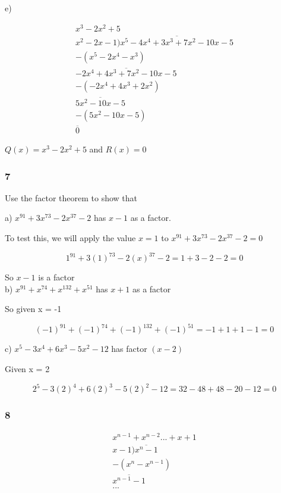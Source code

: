 \documentclass[]{report}
\begin{document}
e)

\begin{align*}
x^3 - 2x^2 + 5\\
x^2 -  2x - 1) \overline{x^5 - 4x^4 + 3x^3 + 7x^2 - 10x -5}\\
- (x^5 - 2x^4 - x^3)\\
\overline{-2x^4 +  4x^3 + 7x^2 - 10x - 5} \\
- (-2x^4 + 4x^3 + 2x^2)\\
\overline{5x^2 - 10x - 5}\\
- (5x^2 - 10x - 5)\\
\overline{0}
\end{align*}

$Q(x) = x^3 - 2x^2 + 5$ and $R(x) = 0$


\subsubsection{7}

Use the factor theorem to show that 

a) $x^91 + 3x^73 - 2x^37 -2$ has $x-1$ as a factor.

To test this, we will apply the value $x = 1$ to $x^91 + 3x^73 - 2x^37 -2 = 0$

\[
1^91 + 3(1)^73 - 2(x)^37 - 2 = 1 + 3 - 2 - 2 = 0
\]

So $x-1$ is a factor\\

b) $x^91 + x^74 + x^132 + x^51$ has $x+1$ as a factor

So given x = -1

\[
(-1)^91 + (-1)^74 + (-1)^132 + (-1)^51 = -1 + 1 + 1 - 1 = 0
\]

c) $x^5  - 3x^4 + 6x^3 - 5x^2 - 12$ has factor $(x-2)$

Given x = 2

\[
2^5 - 3(2)^4 + 6(2)^3 - 5(2)^2 - 12 = 32 - 48 + 48 -20 - 12 = 0
\]

\subsubsection{8}

\begin{align*}
x^{n-1} + x^{n-2} ...  + x + 1\\
x-1)\overline{x^n -1}\\
- (x^n - x^{n-1}) \\
\overline{x^{n-1} - 1}\\
...
\end{align*}
\end{document}
